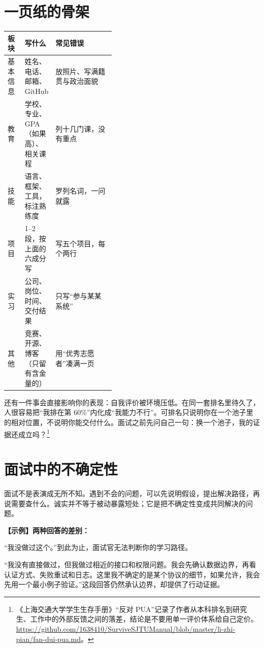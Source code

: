 \documentclass[UTF8,zihao=5,openany]{ctexbook}
\begin{document}
\section{一页纸的骨架}
\begin{center}\small
\begin{tabularx}{\linewidth}{p{0.16\linewidth}p{0.26\linewidth}Y}
\toprule
板块 & 写什么 & 常见错误 \\
\midrule
基本信息 & 姓名、电话、邮箱、GitHub & 放照片、写满籍贯与政治面貌 \\
教育 & 学校、专业、GPA（如果高）、相关课程 & 列十几门课，没有重点 \\
技能 & 语言、框架、工具，标注熟练度 & 罗列名词，一问就露 \\
项目 & 1--2 段，按上面的六成分写 & 写五个项目，每个两行 \\
实习 & 公司、岗位、时间、交付结果 & 只写“参与某某系统” \\
其他 & 竞赛、开源、博客（只留有含金量的） & 用“优秀志愿者”凑满一页 \\
\bottomrule
\end{tabularx}
\end{center}


还有一件事会直接影响你的表现：自我评价被环境压低。在同一套排名里待久了，人很容易把“我排在第 60\%”内化成“我能力不行”。可排名只说明你在一个池子里的相对位置，不说明你能交付什么。面试之前先问自己一句：换一个池子，我的证据还成立吗？\footnote{《上海交通大学学生生存手册》“反对 PUA”记录了作者从本科排名到研究生、工作中的外部反馈之间的落差，结论是不要用单一评价体系给自己定价。\url{https://github.com/1638410/SurviveSJTUManual/blob/master/li-zhi-pian/fan-dui-pua.md}。}

\section{面试中的不确定性}
面试不是表演成无所不知。遇到不会的问题，可以先说明假设，提出解决路径，再说需要查什么。诚实并不等于被动暴露短处；它是把不确定性变成共同解决的问题。

\begin{casebox}
\textbf{【示例】两种回答的差别：}

“我没做过这个。”到此为止，面试官无法判断你的学习路径。

“我没有直接做过，但我做过相近的接口和权限问题。我会先确认数据边界，再看认证方式、失败重试和日志。这里我不确定的是某个协议的细节，如果允许，我会先用一个最小例子验证。”这段回答仍然承认边界，却提供了行动证据。
\end{casebox}
\end{document}
